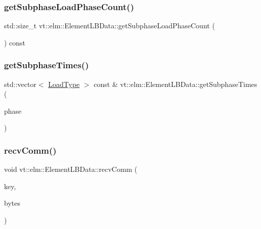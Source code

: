 \subsubsection{\texorpdfstring{get\+Subphase\+Load\+Phase\+Count()}{getSubphaseLoadPhaseCount()}}
{\footnotesize\ttfamily std\+::size\+\_\+t vt\+::elm\+::\+Element\+L\+B\+Data\+::get\+Subphase\+Load\+Phase\+Count (\begin{DoxyParamCaption}{ }\end{DoxyParamCaption}) const}

\mbox{\label{structvt_1_1elm_1_1_element_l_b_data_a60f723efc5e2ce332d3aeb7f72738306}} 
\subsubsection{\texorpdfstring{get\+Subphase\+Times()}{getSubphaseTimes()}}
{\footnotesize\ttfamily std\+::vector$<$ \hyperlink{namespacevt_a8fb51741340b87d7aaee0bef60e9896b}{Load\+Type} $>$ const  \& vt\+::elm\+::\+Element\+L\+B\+Data\+::get\+Subphase\+Times (\begin{DoxyParamCaption}\item[{\hyperlink{namespacevt_a46ce6733d5cdbd735d561b7b4029f6d7}{Phase\+Type}}]{phase }\end{DoxyParamCaption})}

\mbox{\label{structvt_1_1elm_1_1_element_l_b_data_af19f7cc95b8139b7aeec788e6450f28f}} 
\subsubsection{\texorpdfstring{recv\+Comm()}{recvComm()}}
{\footnotesize\ttfamily void vt\+::elm\+::\+Element\+L\+B\+Data\+::recv\+Comm (\begin{DoxyParamCaption}\item[{\hyperlink{structvt_1_1elm_1_1_comm_key}{elm\+::\+Comm\+Key}}]{key,  }\item[{double}]{bytes }\end{DoxyParamCaption})}

